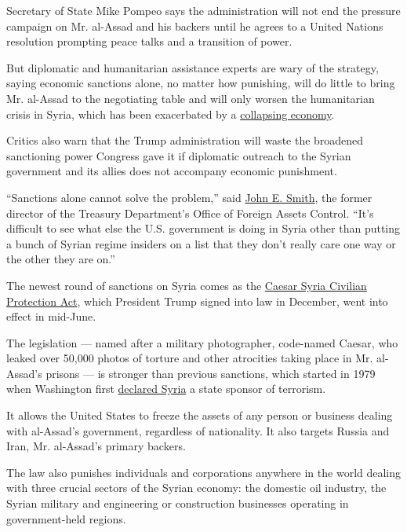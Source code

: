 Secretary of State Mike Pompeo says the administration will not end the
pressure campaign on Mr. al-Assad and his backers until he agrees to a
United Nations resolution prompting peace talks and a transition of
power.

But diplomatic and humanitarian assistance experts are wary of the
strategy, saying economic sanctions alone, no matter how punishing, will
do little to bring Mr. al-Assad to the negotiating table and will only
worsen the humanitarian crisis in Syria, which has been exacerbated by a
\href{https://www.nytimes.com/2020/06/15/world/middleeast/syria-economy-assad-makhlouf.html}{collapsing
economy}.

Critics also warn that the Trump administration will waste the broadened
sanctioning power Congress gave it if diplomatic outreach to the Syrian
government and its allies does not accompany economic punishment.

``Sanctions alone cannot solve the problem,'' said
\href{https://www.mofo.com/people/john-smith.html}{John E. Smith}, the
former director of the Treasury Department's Office of Foreign Assets
Control. ``It's difficult to see what else the U.S. government is doing
in Syria other than putting a bunch of Syrian regime insiders on a list
that they don't really care one way or the other they are on.''

The newest round of sanctions on Syria comes as the
\href{https://www.nytimes.com/2019/12/16/us/politics/us-syria-sanctions-war-crimes.html}{Caesar
Syria Civilian Protection Act}, which President Trump signed into law in
December, went into effect in mid-June.

The legislation --- named after a military photographer, code-named
Caesar, who leaked over 50,000 photos of torture and other atrocities
taking place in Mr. al-Assad's prisons --- is stronger than previous
sanctions, which started in 1979 when Washington first
\href{https://www.state.gov/state-sponsors-of-terrorism/}{declared
Syria} a state sponsor of terrorism.

It allows the United States to freeze the assets of any person or
business dealing with al-Assad's government, regardless of nationality.
It also targets Russia and Iran, Mr. al-Assad's primary backers.

The law also punishes individuals and corporations anywhere in the world
dealing with three crucial sectors of the Syrian economy: the domestic
oil industry, the Syrian military and engineering or construction
businesses operating in government-held regions.

